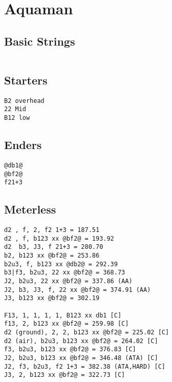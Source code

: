 \documentclass[main.tex]{subfiles}
\begin{document}
\chapter{Aquaman}



\section{Basic Strings}

\begin{lstlisting}[language=FG]
\end{lstlisting}

\section{Starters}
\begin{lstlisting}[language=FG]
B2 overhead
22 Mid
B12 low
\end{lstlisting}

\section{Enders}

\begin{lstlisting}[language=FG]
@db1@
@bf2@
f21+3
\end{lstlisting}

\section{Meterless}


\begin{lstlisting}[language=FG]
d2 , f, 2, f2 1+3 = 187.51
d2 , f, b123 xx @bf2@ = 193.92
d2  b3, J3, f 21+3 = 280.70
b2, b123 xx @bf2@ = 253.86
b2u3, f, b123 xx @db2@ = 292.39
b3|f3, b2u3, 22 xx @bf2@ = 368.73
J2, b2u3, 22 xx @bf2@ = 337.86 (AA)
J2, b3, J3, f, 22 xx @bf2@ = 374.91 (AA)
J3, b123 xx @bf2@ = 302.19 

F13, 1, 1, 1, 1, B123 xx db1 [C]
f13, 2, b123 xx @bf2@ = 259.98 [C]
d2 (ground), 2, 2, b123 xx @bf2@ = 225.02 [C]
d2 (air), b2u3, b123 xx @bf2@ = 264.02 [C]
f3, b2u3, b123 xx @bf2@ = 376.83 [C]
J2, b2u3, b123 xx @bf2@ = 346.48 (ATA) [C]
J2, f3, b2u3, f2 1+3 = 382.38 (ATA,HARD) [C]
J3, 2, b123 xx @bf2@ = 322.73 [C]
\end{lstlisting}


\end{document}
